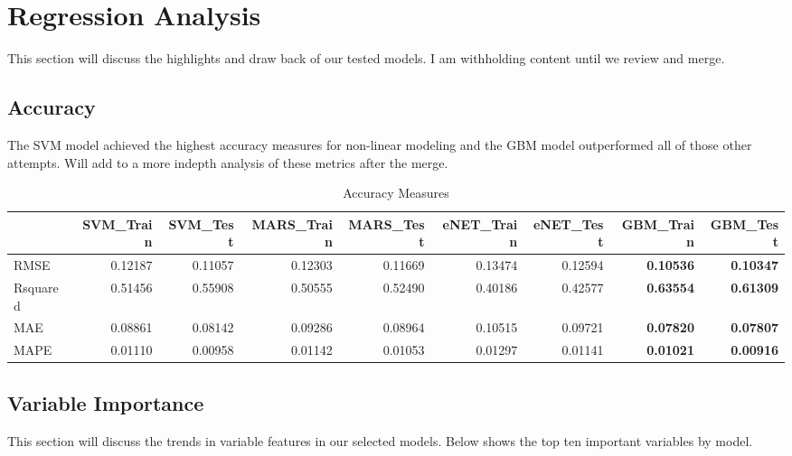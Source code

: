 \documentclass[]{report}
\begin{document}
\hypertarget{regression-analysis}{%
\chapter{Regression Analysis}\label{regression-analysis}}

This section will discuss the highlights and draw back of our tested
models. I am withholding content until we review and merge.

\hypertarget{accuracy}{%
\section{Accuracy}\label{accuracy}}

The SVM model achieved the highest accuracy measures for non-linear
modeling and the GBM model outperformed all of those other attempts.
Will add to a more indepth analysis of these metrics after the merge.

\begin{table}[H]

\caption{\label{tab:unnamed-chunk-11}Accuracy Measures}
\centering
\fontsize{8}{10}\selectfont
\begin{tabular}{lrrrrrr>{\bfseries\leavevmode\color{black}\columncolor[HTML]{B0DFe5}}r>{\bfseries\leavevmode\color{black}\columncolor[HTML]{B0DFe5}}r}
\toprule
  & SVM\_Train & SVM\_Test & MARS\_Train & MARS\_Test & eNET\_Train & eNET\_Test & GBM\_Train & GBM\_Test\\
\midrule
\rowcolor{gray!6}  RMSE & 0.12187 & 0.11057 & 0.12303 & 0.11669 & 0.13474 & 0.12594 & 0.10536 & 0.10347\\
Rsquared & 0.51456 & 0.55908 & 0.50555 & 0.52490 & 0.40186 & 0.42577 & 0.63554 & 0.61309\\
\rowcolor{gray!6}  MAE & 0.08861 & 0.08142 & 0.09286 & 0.08964 & 0.10515 & 0.09721 & 0.07820 & 0.07807\\
MAPE & 0.01110 & 0.00958 & 0.01142 & 0.01053 & 0.01297 & 0.01141 & 0.01021 & 0.00916\\
\bottomrule
\end{tabular}
\end{table}

\hypertarget{variable-importance}{%
\section{Variable Importance}\label{variable-importance}}

This section will discuss the trends in variable features in our
selected models. Below shows the top ten important variables by model.
\end{document}
